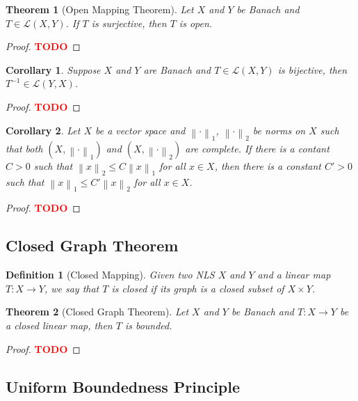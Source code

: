 \documentclass{article}
\newtheorem*{theorem}{Theorem}
\newtheorem*{corollary}{Corollary}
\newtheorem*{definition}{Definition}
\renewcommand{\L}{\mathcal{L}}
\newcommand{\lnorm}[2]{\left\lVert#2 \right\rVert_{#1}}
\newcommand{\td}{\textcolor{red}{\textbf{TODO}}}
\begin{document}
\begin{theorem}[Open Mapping Theorem]
    Let $X$ and $Y$ be Banach and $T \in \L(X,Y)$. If $T$ is surjective, then $T$ is open.
\end{theorem}

\begin{proof}
    \td 
\end{proof}

\begin{corollary}
    Suppose $X$ and $Y$ are Banach and $T \in \L(X,Y)$ is bijective, then $T^{-1} \in \L(Y,X)$. 
\end{corollary}

\begin{proof}
    \td 
\end{proof}

\begin{corollary}
    Let $X$ be a vector space and $\lnorm{1}{\cdot}$, $\lnorm{2}{\cdot}$ be norms on $X$ such that both $(X, \lnorm{1}{\cdot})$ and $(X, \lnorm{2}{\cdot})$ are complete. If there is a contant $C > 0$ such that $\lnorm{2}{x} \leq C \lnorm{1}{x}$ for all $x \in X$, then there is a constant $C' > 0$ such that $\lnorm{1}{x} \leq C' \lnorm{2}{x}$ for all $x \in X$.
\end{corollary}

\begin{proof}
    \td 
\end{proof}

\subsection{Closed Graph Theorem}

\begin{definition}[Closed Mapping]
    Given two NLS $X$ and $Y$ and a linear map $T : X \to Y$, we say that $T$ is closed if its graph is a closed subset of $X \times Y$.
\end{definition}

\begin{theorem}[Closed Graph Theorem]
    Let $X$ and $Y$ be Banach and $T:X \to Y$ be a closed linear map, then $T$ is bounded.  
\end{theorem}

\begin{proof}
    \td 
\end{proof}

\subsection{Uniform Boundedness Principle}
\end{document}
